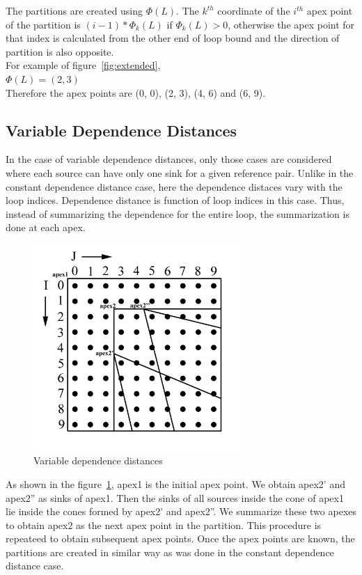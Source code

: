 The partitions are created using $\Phi(L)$. The $k^{th}$ coordinate of the $i^{th}$ apex point of the partition is $(i-1)*\Phi_k(L)$ if $\Phi_k(L) > 0$, otherwise the apex point for that index is calculated from the other end of loop bound and the direction of partition is also opposite. \\

For example of figure~\ref{fig:extended}, \\
$\Phi(L) = (2, 3)$ \\
Therefore the apex points are (0, 0), (2, 3), (4, 6) and (6, 9). \\

\subsection{Variable Dependence Distances}

In the case of variable dependence distances, only those cases are considered where each source can have only one sink for a given reference pair. Unlike in the constant dependence distance case, here the dependence distaces vary with the loop indices. Dependence distance is function of loop indices in this case. Thus, instead of summarizing the dependence for the entire loop, the summarization is done at each apex. \\

\begin{figure}
\caption{Variable dependence distances}
\label{fig:variable1}
\centering \includegraphics[width=0.7\textwidth]{Figures/variable1.jpg}
\end{figure}

As shown in the figure~\ref{fig:variable1}, apex1 is the initial apex point. We obtain apex2' and apex2'' as sinks of apex1. Then the sinks of all sources inside the cone of apex1 lie inside the cones formed by apex2' and apex2''. We summarize these two apexes to obtain apex2 as the next apex point in the partition. This procedure is repeateed to obtain subsequent apex points. Once the apex points are known, the partitions are created in similar way as was done in the constant dependence distance case. \\



